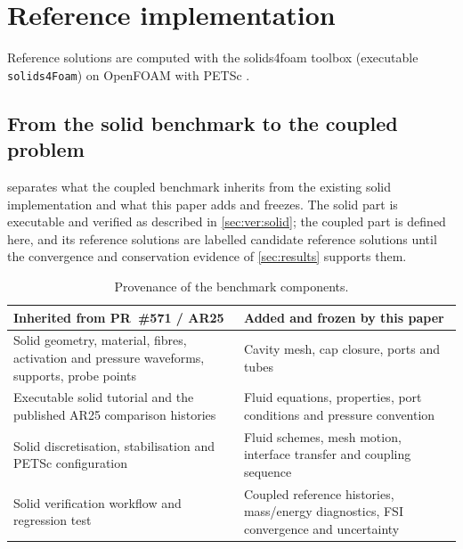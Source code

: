 \section{Reference implementation}\label{sec:methods}

Reference solutions are computed with the solids4foam toolbox
\citep{Cardiff2018} (executable \texttt{solids4Foam}) on OpenFOAM
 with PETSc
. 

\subsection{From the solid benchmark to the coupled problem}\label{sec:methods:inherit}
 separates what the coupled benchmark inherits from the
existing solid implementation \citep{s4fPR571} and what this paper adds and
freezes. The solid part is executable and verified as described in
\cref{sec:ver:solid}; the coupled part is defined here, and its reference
solutions are labelled candidate reference solutions until the convergence
and conservation evidence of \cref{sec:results} supports them.

\begin{table}[t]
\centering
\caption{Provenance of the benchmark components.}
\label{tab:inherit}
\small
\begin{tabularx}{\linewidth}{XX}
\toprule
Inherited from PR~\#571 / AR25 & Added and frozen by this paper \\
\midrule
Solid geometry, material, fibres, activation and pressure waveforms, supports, probe points &
Cavity mesh, cap closure, ports and tubes \\
Executable solid tutorial and the published AR25 comparison histories &
Fluid equations, properties, port conditions and pressure convention \\
Solid discretisation, stabilisation and PETSc configuration &
Fluid schemes, mesh motion, interface transfer and coupling sequence \\
Solid verification workflow and regression test &
Coupled reference histories, mass/energy diagnostics, FSI convergence and uncertainty \\
\bottomrule
\end{tabularx}
\end{table}

